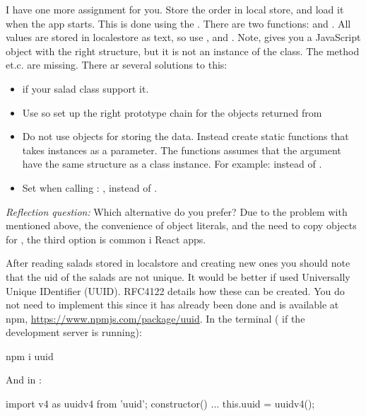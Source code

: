 \documentclass[fleqn, article, a4paper]{memoir}
\begin{document}
\begin{Assignments}
\item I have one more assignment for you. Store the order in local store, and load it when the app starts. This is done using the . There are two functions:  and . All values are stored in localestore as text, so use , and . Note,  gives you a JavaScript object with the right structure, but it is not an instance of the  class. The  method et.c. are missing. There ar several solutions to this:
\begin{itemize}
\item {} if your salad class support it.
\item Use  so set up the right prototype chain for the objects returned from 
\item Do not use  objects for storing the data. Instead create static functions that takes  instances as a parameter. The functions assumes that the argument have the same structure as a  class instance. For example:  instead of .
\item Set  when calling : , instead of .
\end{itemize}
\emph{Reflection question:} Which alternative do you prefer? Due to the problem with  mentioned above, the convenience of object literals, and the need to copy objects for , the third option is common i React apps. 

After reading salads stored in localstore and creating new ones you should note that the uid of the salads are not unique. It would be better if  used Universally Unique IDentifier (UUID). RFC4122 details how these can be created. You do not need to implement this since it has already been done and is available at npm, \url{https://www.npmjs.com/package/uuid}. In the terminal ( if the development server is running):
\begin{Code}
npm i uuid
\end{Code}
\noindent And in :
\begin{Code}
import { v4 as uuidv4 } from 'uuid';
constructor(){ 
  ...
  this.uuid = uuidv4();
}
\end{Code}

\end{Assignments}

\end{document}
